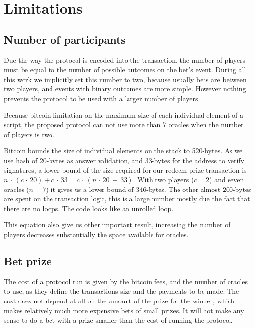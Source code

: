 \section{Limitations}

\subsection{Number of participants}

Due the way the protocol is encoded into the transaction, the number of players
  must be equal to the number of possible outcomes on the bet's event.
During all this work we implicitly set this number to two, because usually bets
  are between two players, and events with binary outcomes are more simple.
However nothing prevents the protocol to be used with a larger number of
  players.

Because bitcoin limitation on the maximum size of each individual element of
  a script, the proposed protocol can not use more than 7 oracles when the
  number of players is two.

Bitcoin bounds the size of individual elements on the stack to 520-bytes.
As we use hash of 20-bytes as answer validation, and 33-bytes for the address
  to verify signatures, a lower bound of the size required for our redeem
  prize transaction is
  $n\, \cdot\, (c\, \cdot\, 20) + c\, \cdot\, 33 = c\, \cdot\, (n\, \cdot\, 20\, +\, 33)$.
With two players ($c = 2$) and seven oracles ($n = 7$) it gives us a lower
  bound of 346-bytes.
The other almost 200-bytes are spent on the transaction logic, this is
  a large number mostly due the fact that there are no loops. The code
  looks like an unrolled loop.

This equation also give us other important result, increasing the number of
  players decreases substantially the space available for oracles.

\subsection{Bet prize}

The cost of a protocol run is given by the bitcoin fees, and the number
  of oracles to use, as they define the transactions size and the payments
  to be made.
The cost does not depend at all on the amount of the prize for the winner,
  which makes relatively much more expensive bets of small prizes.
It will not make any sense to do a bet with a prize smaller than the cost
  of running the protocol.
